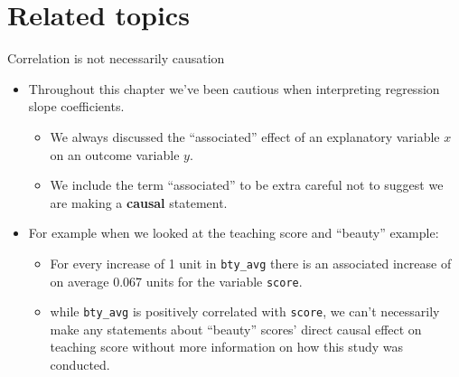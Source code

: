 \documentclass[
  ignorenonframetext,
]{beamer}
\providecommand{\tightlist}{%
  \setlength{\itemsep}{0pt}\setlength{\parskip}{0pt}}
\begin{document}
\hypertarget{related-topics}{%
\section{Related topics}\label{related-topics}}

\begin{frame}[fragile]{Correlation is not necessarily causation}
\protect\hypertarget{correlation-is-not-necessarily-causation}{}
\begin{itemize}
\item
  Throughout this chapter we've been cautious when interpreting
  regression slope coefficients.

  \begin{itemize}
  \tightlist
  \item
    We always discussed the ``associated'' effect of an explanatory
    variable \(x\) on an outcome variable \(y\).
  \item
    We include the term ``associated'' to be extra careful not to
    suggest we are making a \textbf{causal} statement.
  \end{itemize}
\item
  For example when we looked at the teaching score and ``beauty''
  example:

  \begin{itemize}
  \item
    For every increase of 1 unit in \texttt{bty\_avg} there is an
    associated increase of on average 0.067 units for the variable
    \texttt{score}.
  \item
    while \texttt{bty\_avg} is positively correlated with
    \texttt{score}, we can't necessarily make any statements about
    ``beauty'' scores' direct causal effect on teaching score without
    more information on how this study was conducted.
  \end{itemize}
\end{itemize}
\end{frame}
\end{document}
